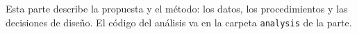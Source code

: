 
Esta parte describe la propuesta y el método: los datos, los procedimientos y las decisiones de diseño.
El código del análisis va en la carpeta \texttt{analysis} de la parte.
